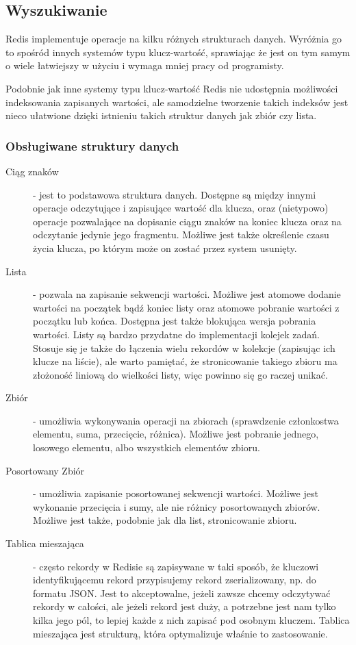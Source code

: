 \subsection*{Wyszukiwanie}

Redis implementuje operacje na kilku różnych strukturach danych.
Wyróżnia go to spośród innych systemów typu klucz-wartość, sprawiając że jest on tym samym o wiele łatwiejszy w użyciu i wymaga mniej pracy od programisty.

Podobnie jak inne systemy typu klucz-wartość Redis nie udostępnia możliwości indeksowania zapisanych wartości, ale samodzielne tworzenie takich indeksów jest nieco ułatwione dzięki istnieniu takich struktur danych jak zbiór czy lista.

\subsubsection*{Obsługiwane struktury danych}

\begin{description}
 \item[Ciąg znaków] - jest to podstawowa struktura danych.
 Dostępne są między innymi operacje odczytujące i zapisujące wartość dla klucza, oraz (nietypowo) operacje pozwalające na dopisanie ciągu znaków na koniec klucza oraz na odczytanie jedynie jego fragmentu.
 Możliwe jest także określenie czasu życia klucza, po którym może on zostać przez system usunięty.

 \item[Lista] - pozwala na zapisanie sekwencji wartości.
 Możliwe jest atomowe dodanie wartości na początek bądź koniec listy oraz atomowe pobranie wartości z początku lub końca.
 Dostępna jest także blokująca wersja pobrania wartości.
 Listy są bardzo przydatne do implementacji kolejek zadań.
 Stosuje się je także do łączenia wielu rekordów w kolekcje (zapisując ich klucze na liście), ale warto pamiętać, że stronicowanie takiego zbioru ma złożoność liniową do wielkości listy, więc powinno się go raczej unikać.

 \item[Zbiór] - umożliwia wykonywania operacji na zbiorach (sprawdzenie członkostwa elementu, suma, przecięcie, różnica).
 Możliwe jest pobranie jednego, losowego elementu, albo wszystkich elementów zbioru.

 \item[Posortowany Zbiór] - umożliwia zapisanie posortowanej sekwencji wartości.
 Możliwe jest wykonanie przecięcia i sumy, ale nie różnicy posortowanych zbiorów.
 Możliwe jest także, podobnie jak dla list, stronicowanie zbioru.

 \item[Tablica mieszająca] - często rekordy w Redisie są zapisywane w taki sposób, że kluczowi identyfikującemu rekord przypisujemy rekord zserializowany, np. do formatu JSON.
 Jest to akceptowalne, jeżeli zawsze chcemy odczytywać rekordy w całości, ale jeżeli rekord jest duży, a potrzebne jest nam tylko kilka jego pól, to lepiej każde z nich zapisać pod osobnym kluczem.
 Tablica mieszająca jest strukturą, która optymalizuje właśnie to zastosowanie.
\end{description}

